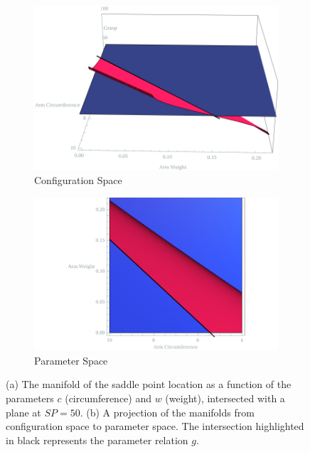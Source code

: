 \documentclass[letterpaper]{article}
\begin{document}
\begin{figure}
        \centering
        \begin{subfigure}[b]{0.3\textwidth}
            \centering
            \includegraphics[width=\textwidth]{prehension_h.png}
            \caption[]%
            {Configuration Space}    
            \label{fig:mean and std of net14}
        \end{subfigure}
        \begin{subfigure}[b]{0.3\textwidth}  
            \centering 
            \includegraphics[width=\textwidth]{prehension_h_top.png}
            \caption[]%
            {{\small Parameter Space}}    
            \label{fig:mean and std of net24}
        \end{subfigure}
    \caption{(a) The manifold of the saddle point location as a function of
    the parameters $c$ (circumference) and $w$ (weight), intersected with a plane 
    at $SP=50$.
    (b) A projection of the manifolds from configuration space to parameter space.
    The intersection highlighted in black represents the parameter relation $g$.}
    \label{prehension_h}
    \end{figure}
\end{document}
